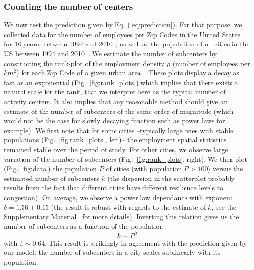         \subsubsection{Counting the number of centers}
        \label{ssub:counting_the_number_of_centers}
        
        
We now test the prediction given by Eq. (\ref{eq:prediction}). For
that purpose, we collected data for the number of employees per Zip
Codes in the United States for 16 years, between 1994 and
2010~\cite{ZBPdata}, as well as the population of all cities in the US
between 1994 and 2010~\cite{CensusData}. We estimate the number of
subcenters by constructing the rank-plot of the employment density
$\rho$ (number of employees per $km^2$) for each Zip Code of a given
urban area~\cite{Griffith:1981,Dokmeci:1994}. These plots display a decay as fast as an exponential
(Fig.~\ref{fig:rank_plots}) which implies that there exists a natural
scale for the rank, that we interpret here as the typical number of
activity centers. It also implies that any reasonable method should
give an estimate of the number of subcenters of the same order of
magnitude (which would not be the case for slowly decaying function
such as power laws for example). We first note that for some cities
--typically large ones with stable populations
(Fig.~\ref{fig:rank_plots}, left)-- the employment spatial statistics
remained stable over the period of study. For other cities, we observe
large variation of the number of subcenters
(Fig.~\ref{fig:rank_plots}, right). We then plot (Fig.~\ref{fig:data})
the population $P$ of cities (with population $P>100$) versus the
estimated number of subcenters $k$ (the dispersion in the scatterplot
probably results from the fact that different cities have different
resilience levels to congestion). On average, we observe a power law
dependance with exponent $\delta=1.56 \pm 0.15$ (the result is robust
with regards to the estimate of $k$, see the Supplementary
Material~\cite{SM} for more details). Inverting this relation gives us
the number of subcenters as a function of the population
%
\begin{equation}
k \sim P^{\beta}
\end{equation}
%
with $\beta \sim 0.64$. This result is strikingly in agreement with
the prediction given by our model: the number of subcenters in a city
scales sublinearly with its population.\\

